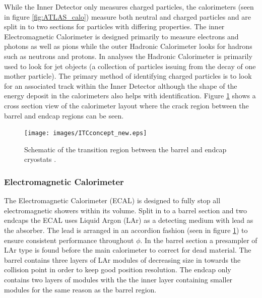 		While the Inner Detector only measures charged particles, the calorimeters (seen in figure \ref{fig:ATLAS_calo}) measure both neutral and charged particles and are split in to two sections for particles with differing properties. The inner Electromagnetic Calorimeter is designed primarily to measure electrons and photons as well as pions while the outer Hadronic Calorimeter looks for hadrons such as neutrons and protons. In analyses the Hadronic Calorimeter is primarily used to look for jet objects (a collection of particles issuing from the decay of one mother particle). The primary method of identifying charged particles is to look for an associated track within the Inner Detector although the shape of the energy deposit in the calorimeters also helps with identification. Figure \ref{fig:ATLAS_calo_crack} shows a cross section view of the calorimeter layout where the crack region between the barrel and endcap regions can be seen.



		\begin{figure}[h!]
			\begin{center}
				\texttt{[image: images/ITCconcept\_new.eps]}
			\end{center}
			\caption{Schematic of the transition region between the barrel and endcap cryostats \cite{Aad:1129811}.}
			\label{fig:ATLAS_calo_crack}
		\end{figure}


		\subsubsection*{Electromagnetic Calorimeter}

		The Electromagnetic Calorimeter (ECAL) is designed to fully stop all electromagnetic showers within its volume. Split in to a barrel section and two endcaps the ECAL uses Liquid Argon (LAr) as a detecting medium with lead as the absorber. The lead is arranged in an accordion fashion (seen in figure \ref{fig:ATLAS_calo_crack}) to ensure consistent performance throughout $\phi$. In the barrel section a presampler of LAr type is found before the main calorimeter to correct for dead material. The barrel contains three layers of LAr modules of decreasing size in towards the collision point in order to keep good position resolution. The endcap only contains two layers of modules with the the inner layer containing smaller modules for the same reason as the barrel region.



